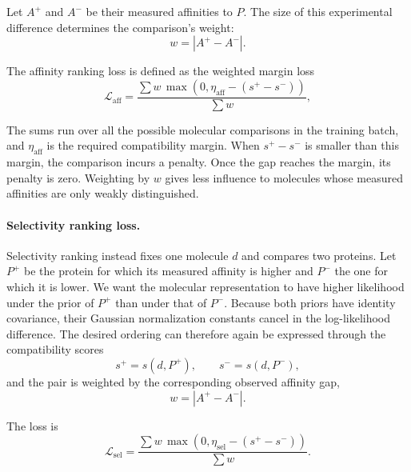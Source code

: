 \documentclass[a4paper,12pt]{article}
\begin{document}
Let $A^+$ and $A^-$ be their measured affinities to $P$. The size of this experimental difference determines the comparison's weight:
\begin{equation*}
    w
    =
    \left|
    A^{+}-A^{-}
    \right|.
\end{equation*}

The affinity ranking loss is defined as the weighted margin loss
\begin{equation*}
    \mathcal{L}_{\mathrm{aff}}
    =
    \frac{
        \displaystyle
        \sum
        w\,
        \max
        \left(
        0,
        \eta_{\mathrm{aff}}
        -
        \left(
        s^{+}-s^{-}
        \right)
        \right)
    }{
        \displaystyle
        \sum w
    },
\end{equation*}

The sums run over all the possible molecular comparisons in the training batch, and $\eta_{\mathrm{aff}}$ is the required compatibility margin. When $s^+-s^-$ is smaller than this margin, the comparison incurs a penalty. Once the gap reaches the margin, its penalty is zero. Weighting by $w$ gives less influence to molecules whose measured affinities are only weakly distinguished.

\paragraph{Selectivity ranking loss.}
Selectivity ranking instead fixes one molecule $d$ and compares two proteins. Let $P^{+}$ be the protein for which its measured affinity is higher and $P^{-}$ the one for which it is lower. We want the molecular representation to have higher likelihood under the prior of $P^{+}$ than under that of $P^{-}$. Because both priors have identity covariance, their Gaussian normalization constants cancel in the log-likelihood difference. The desired ordering can therefore again be expressed through the compatibility scores
\begin{equation*}
    s^{+}=s(d,P^{+}),
    \qquad
    s^{-}=s(d,P^{-}),
\end{equation*}
and the pair is weighted by the corresponding observed affinity gap,
\begin{equation*}
    w
    =
    \left|
    A^{+}-A^{-}
    \right|.
\end{equation*}

The loss is
\begin{equation*}
    \mathcal{L}_{\mathrm{sel}}
    =
    \frac{
        \displaystyle
        \sum
        w\,
        \max
        \left(
        0,
        \eta_{\mathrm{sel}}
        -
        \left(
        s^{+}-s^{-}
        \right)
        \right)
    }{
        \displaystyle
        \sum w
    }.
\end{equation*}
\end{document}
